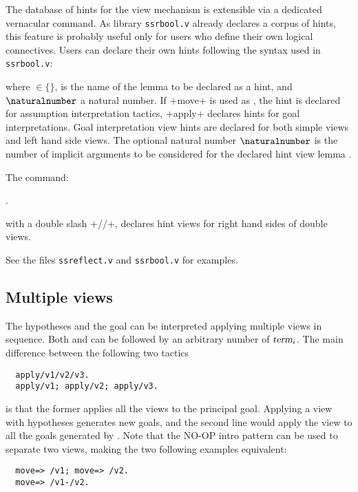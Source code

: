 The database of hints for the view mechanism is extensible via a
dedicated vernacular command. As library {\tt ssrbool.v} already
declares a corpus of hints, this feature is probably useful only for
users who define their own logical connectives. Users can declare
their own hints following the syntax used in {\tt ssrbool.v}:

\begin{center}
   {\tac} \ssrC{/}  \optional{\ssrC{|}{\naturalnumber}}
\end{center}

  where {\tac}$\in \{$$\}$,  is the
name of the lemma to be declared as a hint, and ${\naturalnumber}$ a natural
number. If \ssrL+move+ is used as {\tac}, the hint is declared for
assumption interpretation tactics, \ssrL+apply+ declares hints for goal
interpretations.
Goal interpretation view hints are declared for both simple views and
left hand side views. The optional natural number ${\naturalnumber}$ is the
number of implicit arguments to be considered for the declared hint
view lemma .

The command:

\begin{center}
   \optional{\ssrC{|}{\naturalnumber}}.
\end{center}

with a double slash \ssrL+//+, declares hint views for right hand sides of
double views.


\noindent See the files {\tt ssreflect.v} and {\tt ssrbool.v} for examples.

\subsection{Multiple views}\label{ssec:multiview}

The hypotheses and the goal can be interpreted applying multiple views in
sequence. Both  and  can be followed by an arbitrary number
of \ssrC{/}$\ssrN[i]{term}$. The main difference between the following two tactics
\begin{lstlisting}
  apply/v1/v2/v3.
  apply/v1; apply/v2; apply/v3.
\end{lstlisting}
is that the former applies all the views to the principal goal.
Applying a view with hypotheses generates new goals, and the second line
would apply the view  to all the goals generated by .
Note that the NO-OP intro pattern \ssrC{-} can be used to separate two
views, making the two following examples equivalent:
\begin{lstlisting}
  move=> /v1; move=> /v2.
  move=> /v1-/v2.
\end{lstlisting}

